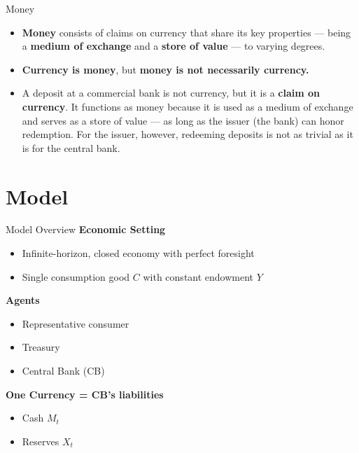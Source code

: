 \documentclass[11pt,aspectratio=169]{beamer}
\begin{document}
\begin{frame}{Money}

\begin{itemize}
  \item \textbf{Money} consists of claims on currency that share its key properties — being a \textbf{medium of exchange} and a \textbf{store of value} — to varying degrees.
  
  \vspace{0.3cm}
  \item \textbf{Currency is money}, but \textbf{money is not necessarily currency.}
  
  \vspace{0.3cm}
  \item A deposit at a commercial bank is not currency, but it is a \textbf{claim on currency}.  
  It functions as money because it is used as a medium of exchange and serves as a store of value — as long as the issuer (the bank) can honor redemption.  
  For the issuer, however, redeeming deposits is not as trivial as it is for the central bank.
\end{itemize}

\vspace{0.4em}
\end{frame}



\section{Model}

\begin{frame}{Model Overview}
\textbf{Economic Setting}
\begin{itemize}
  \item Infinite-horizon, closed economy with perfect foresight
  \item Single consumption good $C$ with constant endowment $Y$
\end{itemize}

\textbf{Agents}
\begin{itemize}
  \item Representative consumer
  \item Treasury
  \item Central Bank (CB)
\end{itemize}

\textbf{One Currency = CB's liabilities}
\begin{itemize}
  \item Cash $M_t$
  \item Reserves $X_t$
\end{itemize}
\end{frame}
\end{document}
